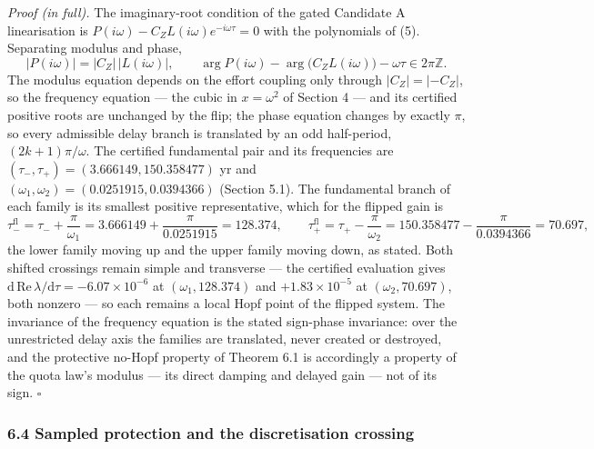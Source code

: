 \documentclass[11pt]{article}
\begin{document}
\emph{Proof (in full).} The imaginary-root condition of the gated
Candidate A linearisation is
\(P(i\omega) - C_Z L(i\omega) e^{-i\omega\tau} = 0\) with the
polynomials of (5). Separating modulus and phase,
\[|P(i\omega)| = |C_Z|\,|L(i\omega)|, \qquad \arg P(i\omega) - \arg\bigl(C_Z L(i\omega)\bigr) - \omega\tau \in 2\pi\mathbb Z.\]
The modulus equation depends on the effort coupling only through
\(|C_Z| = |-C_Z|\), so the frequency equation --- the cubic in
\(x = \omega^2\) of Section 4 --- and its certified positive roots are
unchanged by the flip; the phase equation changes by exactly \(\pi\), so
every admissible delay branch is translated by an odd half-period,
\((2k+1)\pi/\omega\). The certified fundamental pair and its frequencies
are \((\tau_-, \tau_+) = (3.666149, 150.358477)\) yr and
\((\omega_1, \omega_2) = (0.0251915, 0.0394366)\) (Section 5.1). The
fundamental branch of each family is its smallest positive
representative, which for the flipped gain is
\[\tau_-^{\mathrm{fl}} = \tau_- + \frac{\pi}{\omega_1} = 3.666149 + \frac{\pi}{0.0251915} = 128.374, \qquad \tau_+^{\mathrm{fl}} = \tau_+ - \frac{\pi}{\omega_2} = 150.358477 - \frac{\pi}{0.0394366} = 70.697,\]
the lower family moving up and the upper family moving down, as stated.
Both shifted crossings remain simple and transverse --- the certified
evaluation gives
\(\mathrm{d}\,\mathrm{Re}\,\lambda/\mathrm{d}\tau = -6.07\times10^{-6}\)
at \((\omega_1, 128.374)\) and \(+1.83\times10^{-5}\) at
\((\omega_2, 70.697)\), both nonzero --- so each remains a local Hopf
point of the flipped system. The invariance of the frequency equation is
the stated sign-phase invariance: over the unrestricted delay axis the
families are translated, never created or destroyed, and the protective
no-Hopf property of Theorem 6.1 is accordingly a property of the quota
law's modulus --- its direct damping and delayed gain --- not of its
sign. \ensuremath{\square}

\subsubsection{6.4 Sampled protection and the discretisation
crossing}\label{sampled-protection-and-the-discretisation-crossing}
\end{document}
